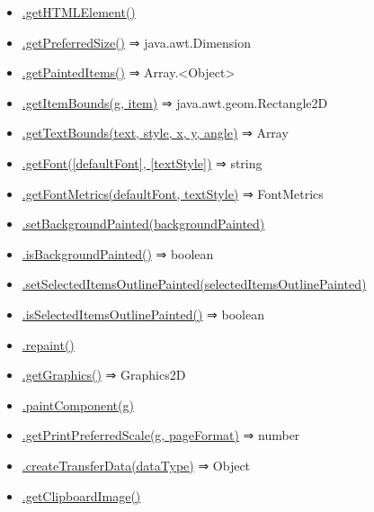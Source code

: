 \documentclass[a4paper]{report}
\providecommand{\tightlist}{%
  \setlength{\itemsep}{0pt}\setlength{\parskip}{0pt}}
\begin{document}
\begin{itemize}
\begin{itemize}
    \begin{itemize}
    \tightlist
    \item
      \protect\hyperlink{PlanComponent+getHTMLElement}{.getHTMLElement()}
    \item
      \protect\hyperlink{PlanComponent+getPreferredSize}{.getPreferredSize()}
      ⇒ java.awt.Dimension
    \item
      \protect\hyperlink{PlanComponent+getPaintedItems}{.getPaintedItems()}
      ⇒ Array.\textless Object\textgreater{}
    \item
      \protect\hyperlink{PlanComponent+getItemBounds}{.getItemBounds(g,
      item)} ⇒ java.awt.geom.Rectangle2D
    \item
      \protect\hyperlink{PlanComponent+getTextBounds}{.getTextBounds(text,
      style, x, y, angle)} ⇒ Array
    \item
      \protect\hyperlink{PlanComponent+getFont}{.getFont({[}defaultFont{]},
      {[}textStyle{]})} ⇒ string
    \item
      \protect\hyperlink{PlanComponent+getFontMetrics}{.getFontMetrics(defaultFont,
      textStyle)} ⇒ FontMetrics
    \item
      \protect\hyperlink{PlanComponent+setBackgroundPainted}{.setBackgroundPainted(backgroundPainted)}
    \item
      \protect\hyperlink{PlanComponent+isBackgroundPainted}{.isBackgroundPainted()}
      ⇒ boolean
    \item
      \protect\hyperlink{PlanComponent+setSelectedItemsOutlinePainted}{.setSelectedItemsOutlinePainted(selectedItemsOutlinePainted)}
    \item
      \protect\hyperlink{PlanComponent+isSelectedItemsOutlinePainted}{.isSelectedItemsOutlinePainted()}
      ⇒ boolean
    \item
      \protect\hyperlink{PlanComponent+repaint}{.repaint()}
    \item
      \protect\hyperlink{PlanComponent+getGraphics}{.getGraphics()} ⇒
      Graphics2D
    \item
      \protect\hyperlink{PlanComponent+paintComponent}{.paintComponent(g)}
    \item
      \protect\hyperlink{PlanComponent+getPrintPreferredScale}{.getPrintPreferredScale(g,
      pageFormat)} ⇒ number
    \item
      \protect\hyperlink{PlanComponent+createTransferData}{.createTransferData(dataType)}
      ⇒ Object
    \item
      \protect\hyperlink{PlanComponent+getClipboardImage}{.getClipboardImage()}

\end{itemize}
\end{itemize}
\end{itemize}
\end{document}
